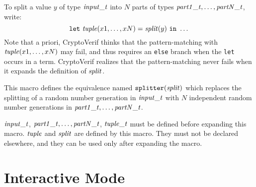 \documentclass{article}
\begin{document}
\begin{itemize}
  To split a value $y$ of type $\mathit{input\_t}$ into $N$ parts 
  of types $\mathit{part1\_t}, \dots, \mathit{partN\_t}$, write:
  \[\texttt{let}\ \vn{tuple}(x1, \dots, xN) = \vn{split}(y)\ \texttt{in}\ \dots\]
  Note that a priori, CryptoVerif thinks that the pattern-matching
  with $\mathit{tuple}(x1, \dots, xN)$ may fail, and thus requires an
  \texttt{else} branch when the \texttt{let} occurs in a term.
  CryptoVerif realizes that the pattern-matching never fails when
  it expands the definition of $\mathit{split}$.
  
This macro defines the equivalence named
$\texttt{splitter}(\mathit{split})$ which replaces the splitting of a
random number generation in $\mathit{input\_t}$ with $N$ independent
random number generations in $\mathit{part1\_t}, \dots, \mathit{partN\_t}$.

$\mathit{input\_t}$, $\mathit{part1\_t}, \dots, \mathit{partN\_t}$,
$\mathit{tuple\_t}$ must be defined before expanding this macro.
$\mathit{tuple}$ and $\mathit{split}$ are defined by this macro. They must not
be declared elsewhere, and they can be used only after expanding the
macro.

\end{itemize}

\fussy

\section{Interactive Mode}\label{sec:interact}
\end{document}
